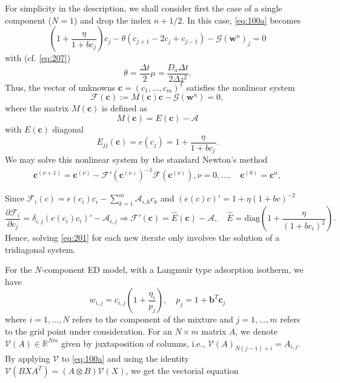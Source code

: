 \documentclass[preprint]{elsarticle}
\theoremstyle{definition}
\newcommand{\bw}{\boldsymbol w}
\newcommand{\bc}{\boldsymbol c}
\newcommand{\bb}{\boldsymbol b}
\begin{document}
For simplicity in the description,
we shall consider first the case of a single component ($N=1$)
  and drop the index $n+1/2$. 
 In this case,  \eqref{eq:100a} becomes
\[ \left (1+ \frac{\eta}{1+bc_j}\right ) c_j - \theta
\left ( c_{j+1}-2 c_j + c_{j-1} \right )
- \mathcal{G}(\bw^n)_j =0
\] with (cf. \eqref{eq:207})
\begin{equation*}  \theta=\frac{\Delta t}{2}\mu=\frac{D_a \Delta t}{2 \Delta z^2}.
\end{equation*}
Thus, 
 the  vector of unknowns $\bc=(c_1,\ldots,c_m)^T$ satisfies the
 nonlinear system
\begin{equation}\label{eq:201}
  \mathcal{F}(\bc):=M(\bc)\bc-\mathcal{G}(\bw^n)=0,
\end{equation}  
where  the
matrix $M(\bc)$ is defined as
\[M(\bc)=E(\bc)-\mathcal{A}\]
with $E(\bc)$  diagonal 
\[ E_{jj}(\bc)= e(c_j)=1+
\frac{\eta}{1+bc_j}.  \]
We may solve this nonlinear system by  the standard  
Newton's method
\begin{align}\label{eq:206}
  \bc^{(\nu+1)}=\bc^{(\nu)}-\mathcal{F}'(\bc^{(\nu)})^{-1}\mathcal{F}(\bc^{(\nu)}),
  \nu=0,\dots, \quad \bc^{(0)}=\bc^{n},
\end{align}


Since
$\mathcal{F}_i(c)=e(c_i)c_i-\sum_{k=1}^{m} \mathcal{A}_{i,k}c_k$ and
$(e(c)c)'=1+\eta(1+bc)^{-2}$
\[\frac{\partial
  \mathcal{F}_i}{\partial
c_j}=\delta_{i,j}(e(c_i)c_i)'-\mathcal{A}_{i,j} \Rightarrow \mathcal{F}'(\bc)=\hat E (\bc)-\mathcal{A}, \quad \hat E= \text{diag}(1+ \frac{\eta}{(1+bc_i)^2}).
\]
Hence, solving
\eqref{eq:201} for each new
iterate only involves the solution of a tridiagonal system.


For the $N$-component ED model, with a Langmuir type adsorption
isotherm, we have
\begin{equation}\label{eq:204}
w_{i, j}=c_{i, j}
\left(1+\frac{\eta_i}{p_j}\right), \quad
p_j=1+\bb^T \bc_j
\end{equation}
where $i=1, \dots , N$ refers to the component of the mixture and $j=1,
\dots , m$ refers to the grid point under consideration.
  For an $N\times m$ matrix $A$, we denote $\mathcal{V}(A)\in
  \mathbb R^{Nm}$ given by juxtaposition of columns, i.e.,
  $\mathcal{V}(A)_{N(j-1)+i}=A_{i,j}$. By applying
  $\mathcal{V}$ to \eqref{eq:100a} and using the identity
  $\mathcal{V}(B X A^T)= (A\otimes B)\mathcal{V}(X)$, we get the vectorial equation
\end{document}
